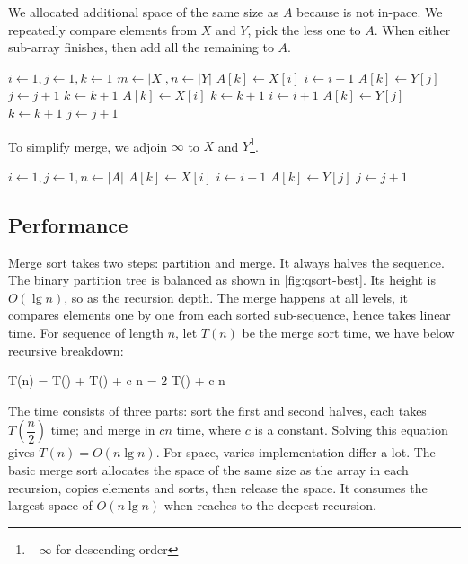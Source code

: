 \documentclass[b5paper]{article}
\begin{document}
We allocated additional space of the same size as $A$ because  is not in-pace. We repeatedly compare elements from $X$ and $Y$, pick the less one to $A$. When either sub-array finishes, then add all the remaining to $A$.

\begin{algorithmic}[1]
  \State $i \gets 1, j\gets 1, k\gets 1$
  \State $m \gets |X|, n \gets |Y|$
      \State $A[k] \gets X[i]$
      \State $i \gets i + 1$
    \Else
      \State $A[k] \gets Y[j]$
      \State $j \gets j + 1$
    \EndIf
    \State $k \gets k + 1$
  \EndWhile
    \State $A[k] \gets X[i]$
    \State $k \gets k + 1$
    \State $i \gets i + 1$
  \EndWhile
    \State $A[k] \gets Y[j]$
    \State $k \gets k + 1$
    \State $j \gets j + 1$
  \EndWhile
\EndProcedure
\end{algorithmic}

To simplify merge, we adjoin $\infty$ to $X$ and $Y$\footnote{$-\infty$ for descending order}.

\begin{algorithmic}[1]
  \State {}
  \State {}
  \State $i \gets 1, j\gets 1, n \gets |A|$
      \State $A[k] \gets X[i]$
      \State $i \gets i + 1$
    \Else
      \State $A[k] \gets Y[j]$
      \State $j \gets j + 1$
    \EndIf
  \EndFor
\EndProcedure
\end{algorithmic}

\subsection{Performance}

Merge sort takes two steps: partition and merge. It always halves the sequence. The binary partition tree is balanced as shown in \cref{fig:qsort-best}. Its height is $O(\lg n)$, so as the recursion depth. The merge happens at all levels, it compares elements one by one from each sorted sub-sequence, hence takes linear time. For sequence of length $n$, let $T(n)$ be the merge sort time, we have below recursive breakdown:

\be
T(n) = T() + T() + c n = 2 T() + c n
\ee

The time consists of three parts: sort the first and second halves, each takes $T(\dfrac{n}{2})$ time; and merge in $c n$ time, where $c$ is a constant. Solving this equation gives $T(n) = O(n \lg n)$. For space, varies implementation differ a lot. The basic merge sort allocates the space of the same size as the array in each recursion, copies elements and sorts, then release the space. It consumes the largest space of $O(n \lg n)$ when reaches to the deepest recursion.
\end{document}
